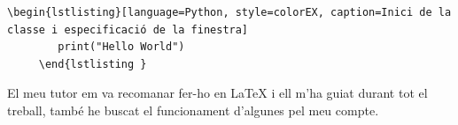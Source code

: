 \begin{lstlisting}[style=latex, caption={Exemple de codi Hello world mostrat amb el paquet listings}, label={lst:prova-hello}]
    \begin{lstlisting}[language=Python, style=colorEX, caption=Inici de la classe i especificació de la finestra]
        print("Hello World")
     \end{lstlisting }
\end{lstlisting}

El meu tutor em va recomanar fer-ho en LaTeX i ell m'ha guiat durant tot el treball, també he buscat el funcionament d'algunes pel meu compte. \cite{learnlatex2023} \cite{RubiksCubeTikz} \cite{HeaderambFancy}  
